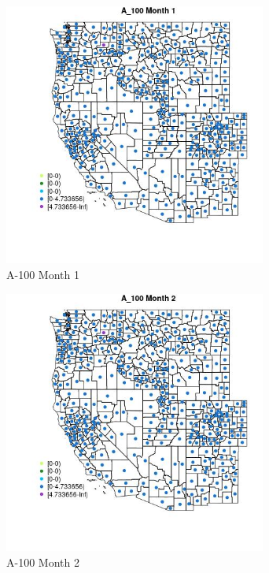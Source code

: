 \begin{figure} 
\centering  
\includegraphics[width=0.77\textwidth]{Code_Outputs/df_report_ML_predictors_CountyCentroid_Locations_Dates_2008-01-01to2018-12-31_MapObsMo1A_100.jpg} 
\caption{\label{fig:df_report_ML_predictors_CountyCentroid_Locations_Dates_2008-01-01to2018-12-31MapObsMo1A_100}A-100 Month 1} 
\end{figure} 
 

\clearpage 

\begin{figure} 
\centering  
\includegraphics[width=0.77\textwidth]{Code_Outputs/df_report_ML_predictors_CountyCentroid_Locations_Dates_2008-01-01to2018-12-31_MapObsMo2A_100.jpg} 
\caption{\label{fig:df_report_ML_predictors_CountyCentroid_Locations_Dates_2008-01-01to2018-12-31MapObsMo2A_100}A-100 Month 2} 
\end{figure} 
 


